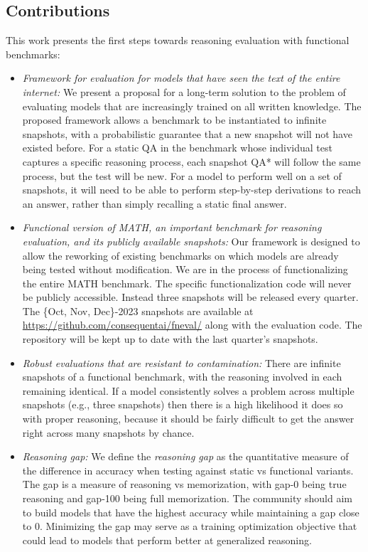 \documentclass[11pt,a4paper]{article}
\begin{document}
\subsection{Contributions}
This work presents the first steps towards reasoning evaluation with functional benchmarks:
\begin{itemize}
  \item {\em Framework for evaluation for models that
    have seen the text of the entire internet:}
    We present a proposal for a long-term solution to the problem of evaluating
    models that are increasingly trained on all written knowledge. The proposed
    framework allows a benchmark to be instantiated to infinite snapshots, with
    a probabilistic guarantee that a new snapshot will not have existed before.
    For a static QA in the benchmark whose individual test captures a specific
    reasoning process, each snapshot QA* will follow the same process, but
    the test will be new. For a model to perform well on a set of
    snapshots, it will need to be able to perform step-by-step derivations to
    reach an answer, rather than simply recalling a static final answer.


  \item {\em Functional version of MATH, an important benchmark
    for reasoning evaluation, and its publicly available snapshots:}
    Our framework is designed to allow the reworking of existing benchmarks on
    which models are already being tested without modification. We are
    in the process of functionalizing the entire MATH benchmark.
    The specific functionalization code will never
    be publicly accessible. Instead three snapshots will be released every quarter.
    The \{Oct, Nov, Dec\}-2023 snapshots are available at
    \url{https://github.com/consequentai/fneval/} along with the evaluation code.
    The repository will be kept up to date with the last quarter's snapshots.


  \item {\em Robust
    evaluations that are resistant to contamination:}
    There are infinite snapshots of a functional benchmark, with the reasoning
    involved in each remaining  identical. If a model consistently solves a
    problem across multiple snapshots (e.g., three snapshots) then there is a
    high likelihood it does so with proper reasoning, because it should be
    fairly difficult to get the answer right across many snapshots by chance.

  \item {\em Reasoning gap:} We define the {\em reasoning
    gap} as the quantitative measure of the difference in accuracy when
    testing against static vs functional variants.
    The gap is a measure of reasoning vs memorization, with gap-0 being true
    reasoning and gap-100 being full memorization. The community should aim to
    build models that have the highest accuracy while maintaining a gap close
    to 0. Minimizing the gap may serve as a training optimization objective
    that could lead to models that perform better at generalized reasoning.


\end{itemize}
\end{document}
